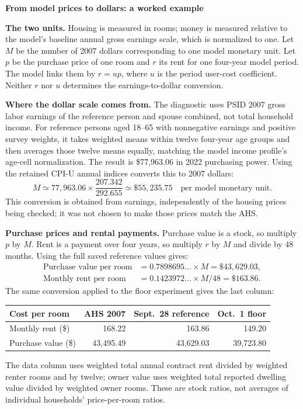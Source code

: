 \documentclass[11pt,letterpaper]{article}
\begin{document}
\newpage
\begingroup
\setlength{\parskip}{4pt}
\begin{center}
{\large\bfseries From model prices to dollars: a worked example}
\end{center}

\textbf{The two units.} Housing is measured in rooms; money is measured relative
to the model's baseline annual gross earnings scale, which is normalized to one.
Let $M$ be the number of 2007 dollars corresponding to one model monetary unit.
Let $p$ be the purchase price of one room and $r$ its rent for one four-year model
period. The model links them by $r=up$, where $u$ is the period user-cost
coefficient. Neither $r$ nor $u$ determines the earnings-to-dollar conversion.

\textbf{Where the dollar scale comes from.} The diagnostic uses PSID 2007 gross
labor earnings of the reference person and spouse combined, not total household
income. For reference persons aged 18--65 with nonnegative earnings and positive
survey weights, it takes weighted means within twelve four-year age groups and
then averages those twelve means equally, matching the model income profile's
age-cell normalization. The result is \$77,963.06 in 2022 purchasing power. Using
the retained CPI-U annual indices converts this to 2007 dollars:
\[
 M\simeq77{,}963.06\times\frac{207.342}{292.655}
   \simeq\$55{,}235.75\quad\text{per model monetary unit}.
\]
This conversion is obtained from earnings, independently of the housing prices
being checked; it was not chosen to make those prices match the AHS.

\textbf{Purchase prices and rental payments.} Purchase value is a stock, so
multiply $p$ by $M$. Rent is a payment over four years, so multiply $r$ by $M$
and divide by 48 months. Using the full saved reference values gives:
\begin{align*}
 \text{Purchase value per room}
   &=0.7898695\ldots\times M=\$43{,}629.03,\\
 \text{Monthly rent per room}
   &=0.1423972\ldots\times M/48=\$163.86.
\end{align*}
The same conversion applied to the floor experiment gives the last column:
\begin{center}
\begin{tabular}{lrrr}
\toprule
Cost per room & AHS 2007 & Sept.\ 28 reference & Oct.\ 1 floor\\
\midrule
Monthly rent (\$) & 168.22 & 163.86 & 149.20\\
Purchase value (\$) & 43,495.49 & 43,629.03 & 39,723.80\\
\bottomrule
\end{tabular}
\end{center}
The data column uses weighted total annual contract rent divided by weighted
renter rooms and by twelve; owner value uses weighted total reported dwelling
value divided by weighted owner rooms. These are stock ratios, not averages of
individual households' price-per-room ratios.
\end{document}
